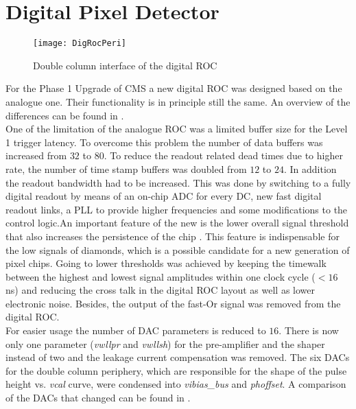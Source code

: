\section{Digital Pixel Detector}\label{s23}
\begin{wrapfigure}{r}{4.5cm}
	\vspace*{-10pt}
	\texttt{[image: DigRocPeri]}
	\caption{Double column interface of the digital \ac{ROC} \cite{hits}}
	\label{p12}
	\vspace*{-15pt}
\end{wrapfigure} 
For the Phase 1 Upgrade of \ac{CMS} a new digital \ac{ROC} was designed based on the analogue one. Their functionality is in principle still the same. An overview of the differences can be found in .\\
One of the limitation of the analogue \ac{ROC} was a limited buffer size for the Level 1 trigger latency. To overcome this problem the number of data buffers was increased from $32$ to $80$. To reduce the readout related dead times due to higher rate, the number of time stamp buffers was doubled from $12$ to $24$. In addition the readout bandwidth had to be increased. This was done by switching to a fully digital readout by means of an on-chip \ac{ADC} for every \ac{DC}, new fast digital readout links, a \ac{PLL} to provide higher frequencies and some modifications to the control logic.An important feature of the new is the lower overall signal threshold that also increases the persistence of the chip \cite{hits}. This feature is indispensable for the low signals of diamonds, which is a possible candidate for a new generation of pixel chips. Going to lower thresholds was achieved by keeping the timewalk between the highest and lowest signal amplitudes within one clock cycle ($<16\,$ns) and reducing the cross talk in the digital \ac{ROC} layout as well as lower electronic noise. Besides, the output of the fast-Or signal was removed from the digital \ac{ROC}.\\
For easier usage the number of \ac{DAC} parameters is reduced to $16$. There is now only one parameter (\textit{vwllpr} and \textit{vwllsh}) for the pre-amplifier and the shaper instead of two and the leakage current compensation was removed. The six \ac{DAC}s for the double column periphery, which are responsible for the shape of the pulse height vs. \textit{vcal} curve, were condensed into \textit{vibias\_bus} and \textit{phoffset}. A comparison of the \ac{DAC}s that changed can be found in .
